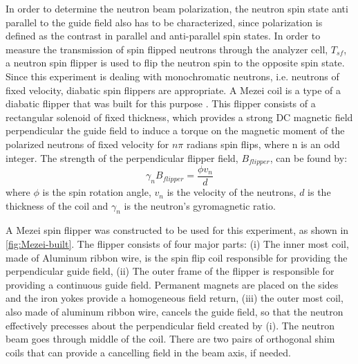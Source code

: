 In order to determine the neutron beam polarization, the neutron spin state anti parallel to the guide field also has to be characterized, since polarization is defined as the contrast in parallel and anti-parallel spin states. In order to  measure the transmission of spin flipped neutrons through the analyzer cell, $T_{sf}$, a neutron spin flipper is used to flip the neutron spin to the opposite spin state. Since this experiment is dealing with monochromatic neutrons, i.e. neutrons of fixed velocity, diabatic spin flippers are appropriate. A Mezei coil is a type of a diabatic flipper that was built for this purpose \cite{Mezei1972, Hayter1978}. This flipper consists of a rectangular solenoid of fixed thickness, which provides a strong DC magnetic field perpendicular the guide field to induce a torque on the magnetic moment of the polarized neutrons of fixed velocity for $n\pi$ radians spin flips, where n is an odd integer. The strength of the perpendicular flipper field, $B_{flipper}$, can be found by:
\begin{equation}
    \gamma_n B_{flipper} = \frac{\phi v_n}{ d}
\end{equation}
where $\phi$ is the spin rotation angle, $v_n$ is the velocity of the neutrons, $d$ is the thickness of the coil and $\gamma_n$ is the neutron's gyromagnetic ratio.

A Mezei spin flipper was constructed to be used for this experiment, as shown in \cref{fig:Mezei-built}. The flipper consists of four major parts: (i) The inner most coil, made of Aluminum ribbon wire, is the spin flip coil responsible for providing the perpendicular guide field, (ii) The outer frame of the flipper is responsible for providing a continuous guide field. Permanent magnets are placed on the sides and the iron yokes provide a homogeneous field return, (iii) the outer most coil, also made of aluminum ribbon wire, cancels the guide field, so that the neutron effectively precesses about the perpendicular field created by (i). The neutron beam goes through middle of the coil. There are two pairs of orthogonal shim coils that can provide a cancelling field in the beam axis, if needed.



